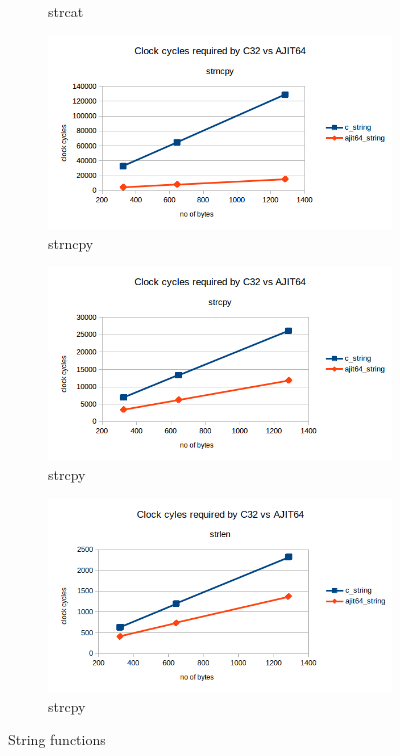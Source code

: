 \documentclass[12pt]{article}
\begin{document}
\begin{figure}[H]
\begin{subfigure}[b]{0.4\textwidth}
         \caption{strcat}
     \end{subfigure}
       \hfill
     \begin{subfigure}[b]{0.4\textwidth}
         \centering
         \includegraphics[width=\textwidth]{strncpy.png}
         \caption{strncpy}
         \end{subfigure}
       \hfill
     \begin{subfigure}[b]{0.4\textwidth}
         \centering
         \includegraphics[width=\textwidth]{strcpy.png}
         \caption{strcpy}
     \end{subfigure}
       \hfill
     \begin{subfigure}[b]{0.4\textwidth}
         \centering
         \includegraphics[width=\textwidth]{strlen.png}
         \caption{strcpy}
     \end{subfigure}

        \caption{String functions}
        \label{fig:three graphs}
\end{figure}
\end{document}
